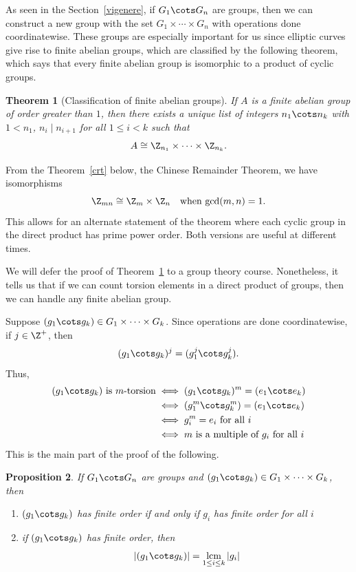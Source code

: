 \documentclass[12pt]{amsart}
\theoremstyle{plain}
\newtheorem{thm}{Theorem}[section]
\newtheorem{prop}[thm]{Proposition}
\theoremstyle{definition}
\theoremstyle{remark}
\begin{document}
As seen in the Section~\ref{vigenere}, if $G_1\cots G_n$ are groups,
then we can construct a new group with the set $G_1\times\cdots\times G_n$ with
operations done coordinatewise.  These groups are especially important
for us since elliptic curves give rise to finite abelian groups, which
are classified by the following theorem, which says that every finite
abelian group is isomorphic to a product of cyclic groups.
\begin{thm}[Classification of finite abelian groups]
\label{finiteabelian}
  If $A$ is a finite abelian group of order greater than $1$, then
  there exists a unique list of integers $n_1\cots n_k$ with $1<n_1$,
  $n_i\mid n_{i+1}$ for all $1\leq i<k$ such that 
  \[ A \cong \Z_{n_1}\times\cdots\times \Z_{n_k}.\]
\end{thm}
From the Theorem~\ref{crt} below, the Chinese Remainder Theorem, we
have isomorphisms
\[ \Z_{mn} \cong \Z_m\times \Z_n \quad\text{when $\gcd(m,n)=1$}.\]
This allows for an alternate statement of the theorem where each
cyclic group in the direct product has prime power order.  Both
versions are useful at different times.

We will defer the proof of Theorem~\ref{finiteabelian} to a group
theory course.  Nonetheless, it tells us that if we can count torsion
elements in a direct product of groups, then we can handle any finite
abelian group.

Suppose $(g_1\cots g_k)\in G_1\times\cdots \times G_k$.  Since
operations are done coordinatewise, if $j\in\Z^+$, then
\[ (g_1\cots g_k)^j = (g_1^j\cots g_k^j).\]
Thus,
\begin{align*}
(g_1\cots g_k)\text{ is $m$-torsion}
&\iff  (g_1\cots g_k)^m=(e_1\cots  e_k) \\
&\iff  (g_1^m\cots g_k^m)=(e_1\cots  e_k) \\
&\iff g_i^m=e_i \text{ for all $i$} \\
&\iff m \text{ is a multiple of $g_i$ for all $i$}
\end{align*}
This is the main part of the proof of the following.
\begin{prop}
If $G_1\cots G_n$ are groups and $(g_1\cots g_k)\in G_1\times\cdots
\times G_k$, then
\begin{enumerate}
\item $(g_1\cots g_k)$ has finite order if and only if $g_i$ has
  finite order for all $i$
\item if $(g_1\cots g_k)$ has finite order, then
\[ |(g_1\cots g_k)| = \operatorname*{lcm}_{1\leq i \leq k} |g_i|\]
\end{enumerate}
\end{prop}
\end{document}
